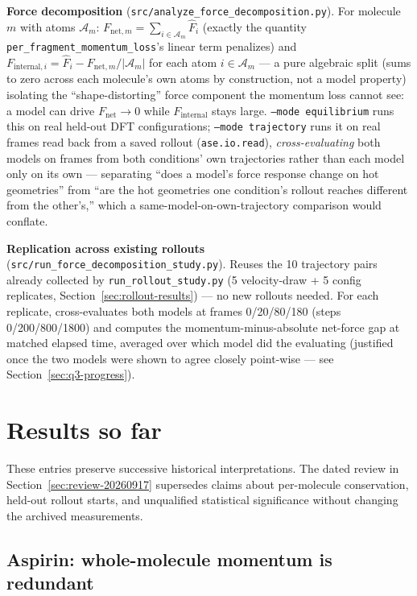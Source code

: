 \documentclass[11pt]{article}
\begin{document}
\textbf{Force decomposition} (\texttt{src/analyze\_force\_decomposition.py}).
For molecule $m$ with atoms $\mathcal{A}_m$: $F_{\mathrm{net},m} =
\sum_{i\in\mathcal{A}_m} \hat F_i$ (exactly the quantity
\texttt{per\_fragment\_momentum\_loss}'s linear term penalizes) and
$F_{\mathrm{internal},i} = \hat F_i - F_{\mathrm{net},m}/|\mathcal{A}_m|$ for
each atom $i\in\mathcal{A}_m$ --- a pure algebraic split (sums to zero across
each molecule's own atoms by construction, not a model property) isolating
the ``shape-distorting'' force component the momentum loss cannot see: a
model can drive $F_{\mathrm{net}}\to 0$ while $F_{\mathrm{internal}}$ stays
large. \texttt{--mode equilibrium} runs this on real held-out DFT
configurations; \texttt{--mode trajectory} runs it on real frames read back
from a saved rollout (\texttt{ase.io.read}), \emph{cross-evaluating} both
models on frames from both conditions' own trajectories rather than each
model only on its own --- separating ``does a model's force response change
on hot geometries'' from ``are the hot geometries one condition's rollout
reaches different from the other's,'' which a same-model-on-own-trajectory
comparison would conflate.

\textbf{Replication across existing rollouts}
(\texttt{src/run\_force\_decomposition\_study.py}). Reuses the 10 trajectory
pairs already collected by \texttt{run\_rollout\_study.py} (5 velocity-draw
+ 5 config replicates, Section~\ref{sec:rollout-results}) --- no new
rollouts needed. For each replicate, cross-evaluates both models at frames
0/20/80/180 (steps 0/200/800/1800) and computes the momentum-minus-absolute
net-force gap at matched elapsed time, averaged over which model did the
evaluating (justified once the two models were shown to agree closely
point-wise --- see Section~\ref{sec:q3-progress}).

\section{Results so far}
\label{sec:results}

These entries preserve successive historical interpretations. The dated
review in Section~\ref{sec:review-20260917} supersedes claims about
per-molecule conservation, held-out rollout starts, and unqualified
statistical significance without changing the archived measurements.

\subsection{Aspirin: whole-molecule momentum is redundant}
\end{document}
